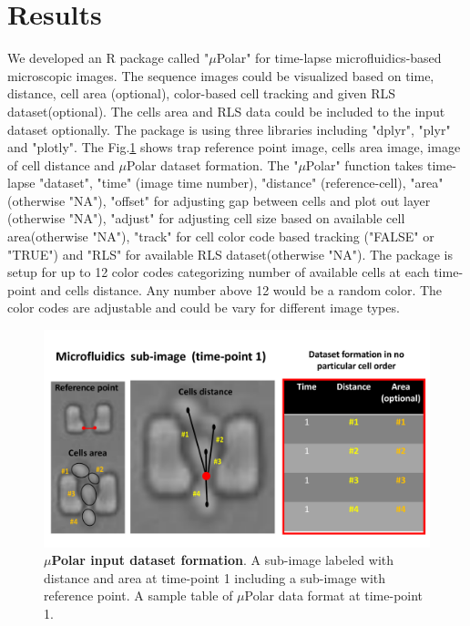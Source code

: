 \documentclass[conference]{IEEEtran}
\begin{document}
 


\section{Results}

We developed an R package called "$\mu$Polar" for time-lapse microfluidics-based microscopic images. The sequence images could be visualized based on time, distance, cell area (optional), color-based cell tracking and given RLS dataset(optional). The cells area and RLS data could be included to the input dataset optionally. The package is using three libraries including "dplyr", "plyr" and "plotly". The Fig.\ref{fig:table} shows trap reference point image, cells area image, image of cell distance and $\mu$Polar dataset formation. The "$\mu$Polar" function takes time-lapse "dataset", "time" (image time number), "distance" (reference-cell), "area" (otherwise "NA"), "offset" for adjusting gap between cells and plot out layer (otherwise "NA"), "adjust" for  adjusting  cell size based on available cell area(otherwise "NA"), "track" for cell color code based tracking ("FALSE" or "TRUE") and "RLS" for available RLS dataset(otherwise "NA"). The package is setup for up to 12 color codes categorizing number of available cells at each time-point and cells distance. Any number above 12 would be a random color. The color codes are adjustable and could be vary for different image types.  

\begin{figure}
\centering
\includegraphics[width=\textwidth,height=10 cm]{Patterns/table.pdf}
\caption{ \textbf{ $\mu$Polar input dataset formation}. A sub-image labeled with distance and area at time-point 1 including a sub-image with reference point. A sample table of $\mu$Polar data format at time-point 1.}
\label{fig:table}
\end{figure}
\end{document}
